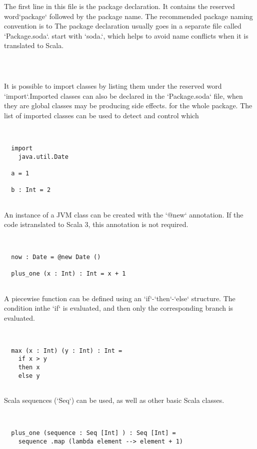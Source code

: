 \documentclass[12pt,a4paper]{article}
\begin{document}
The first line in this file is the package declaration. It contains the reserved word`package` followed by the package name. The recommended package naming convention is to
The package declaration usually goes in a separate file called `Package.soda`. start with `soda.`, which helps to avoid name conflicts when it is translated to Scala.


\begin{lstlisting}



\end{lstlisting}

It is possible to import classes by listing them under the reserved word `import`.Imported classes can also be declared in the `Package.soda` file, when they are global
classes may be producing side effects. for the whole package. The list of imported classes can be used to detect and control which


\begin{lstlisting}


  import
    java.util.Date

  a = 1

  b : Int = 2


\end{lstlisting}

An instance of a JVM class can be created with the `@new` annotation. If the code istranslated to Scala 3, this annotation is not required. 


\begin{lstlisting}


  now : Date = @new Date ()

  plus_one (x : Int) : Int = x + 1


\end{lstlisting}

A piecewise function can be defined using an `if`-`then`-`else` structure. The condition inthe `if` is evaluated, and then only the corresponding branch is evaluated. 


\begin{lstlisting}


  max (x : Int) (y : Int) : Int =
    if x > y
    then x
    else y


\end{lstlisting}

Scala sequences (`Seq`) can be used, as well as other basic Scala classes. 


\begin{lstlisting}


  plus_one (sequence : Seq [Int] ) : Seq [Int] =
    sequence .map (lambda element --> element + 1)


\end{lstlisting}
\end{document}
